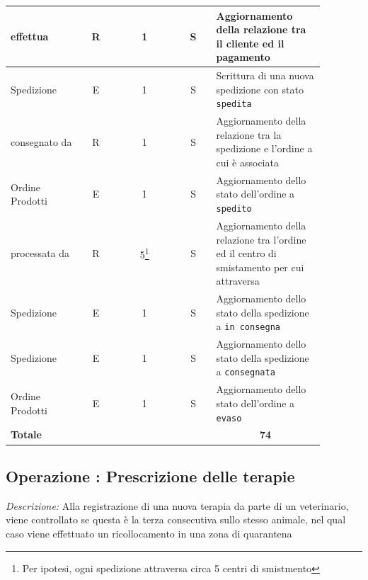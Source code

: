 \documentclass[12pt,a4paper]{article}
\begin{document}
\begin{center}
\begin{longtable}{|p{0.2\linewidth}|p{0.1\linewidth}|p{0.175\linewidth}|p{0.1\linewidth}|p{0.3\linewidth}|}
\hline
effettua
 & 
\multicolumn{1}{|c|}{R}
 & 
\multicolumn{1}{|c|}{1}
 & 
\multicolumn{1}{|c|}{S}
 & 
Aggiornamento della relazione tra il cliente ed il pagamento
\\
\hline
Spedizione
 & 
\multicolumn{1}{|c|}{E}
 & 
\multicolumn{1}{|c|}{1}
 & 
\multicolumn{1}{|c|}{S}
 & 
Scrittura di una nuova spedizione con stato \texttt{spedita}
\\
\hline
consegnato da
 & 
\multicolumn{1}{|c|}{R}
 & 
\multicolumn{1}{|c|}{1}
 & 
\multicolumn{1}{|c|}{S}
 & 
Aggiornamento della relazione tra la spedizione e l'ordine a cui è associata
\\
\hline
Ordine Prodotti
 & 
\multicolumn{1}{|c|}{E}
 & 
\multicolumn{1}{|c|}{1}
 & 
\multicolumn{1}{|c|}{S}
 & 
Aggiornamento dello stato dell'ordine a \texttt{spedito}
\\
\hline
processata da
 & 
\multicolumn{1}{|c|}{R}
 & 
\multicolumn{1}{|c|}{5\footnote{Per ipotesi, ogni spedizione attraversa circa 5 centri di smistmento}}
 & 
\multicolumn{1}{|c|}{S}
 & 
Aggiornamento della relazione tra l'ordine ed il centro di smistamento per cui attraversa
\\
\hline
Spedizione
 & 
\multicolumn{1}{|c|}{E}
 & 
\multicolumn{1}{|c|}{1}
 & 
\multicolumn{1}{|c|}{S}
 & 
Aggiornamento dello stato della spedizione a \texttt{in consegna}
\\
\hline
Spedizione
 & 
\multicolumn{1}{|c|}{E}
 & 
\multicolumn{1}{|c|}{1}
 & 
\multicolumn{1}{|c|}{S}
 & 
Aggiornamento dello stato della spedizione a \texttt{consegnata}
\\
\hline
Ordine Prodotti
 & 
\multicolumn{1}{|c|}{E}
 & 
\multicolumn{1}{|c|}{1}
 & 
\multicolumn{1}{|c|}{S}
 & 
Aggiornamento dello stato dell'ordine a \texttt{evaso}
\\
\hline
\multicolumn{4}{|l|}{\textbf{Totale}}
 & 
\multicolumn{1}{|c|}{\textbf{74}}
\\
\hline
\end{longtable}\end{center}

\subsection*{Operazione \thecounterAccessi{}: Prescrizione delle terapie}
\noindent\textit{Descrizione:} Alla registrazione di una nuova terapia da parte di un veterinario, viene controllato se questa è la terza consecutiva sullo stesso animale, nel qual caso viene effettuato un ricollocamento in una zona di quarantena
\end{document}
